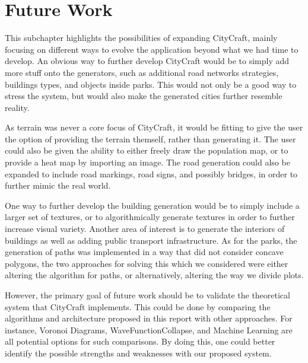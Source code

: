 \section{Future Work}
This subchapter highlights the possibilities of expanding CityCraft, mainly focusing on different ways to evolve the application beyond what we had time to develop.
An obvious way to further develop CityCraft would be to simply add more stuff onto the generators, such as additional road networks strategies, buildings types, and objects inside parks.
This would not only be a good way to stress the system, but would also make the generated cities further resemble reality.
 
As terrain was never a core focus of CityCraft, it would be fitting to give the user the option of providing the terrain themself, rather than generating it. 
The user could also be given the ability to either freely draw the population map, or to provide a heat map by importing an image. 
The road generation could also be expanded to include road markings, road signs, and possibly bridges, in order to further mimic the real world.
  
One way to further develop the building generation would be to simply include a larger set of textures, or to algorithmically generate textures in order to further increase visual variety.
Another area of interest is to generate the interiors of buildings as well as adding public transport infrastructure.
As for the parks, the generation of paths was implemented in a way that did not consider concave polygons, the two approaches for solving this which we considered were either altering the algorithm for paths, or alternatively, altering the way we divide plots.

However, the primary goal of future work should be to validate the theoretical system that CityCraft implements.
This could be done by comparing the algorithms and architecture proposed in this report with other approaches.
For instance, Voronoi Diagrams, WaveFunctionCollapse, and Machine Learning are all potential options for such comparisons.
By doing this, one could better identify the possible strengths and weaknesses with our proposed system.